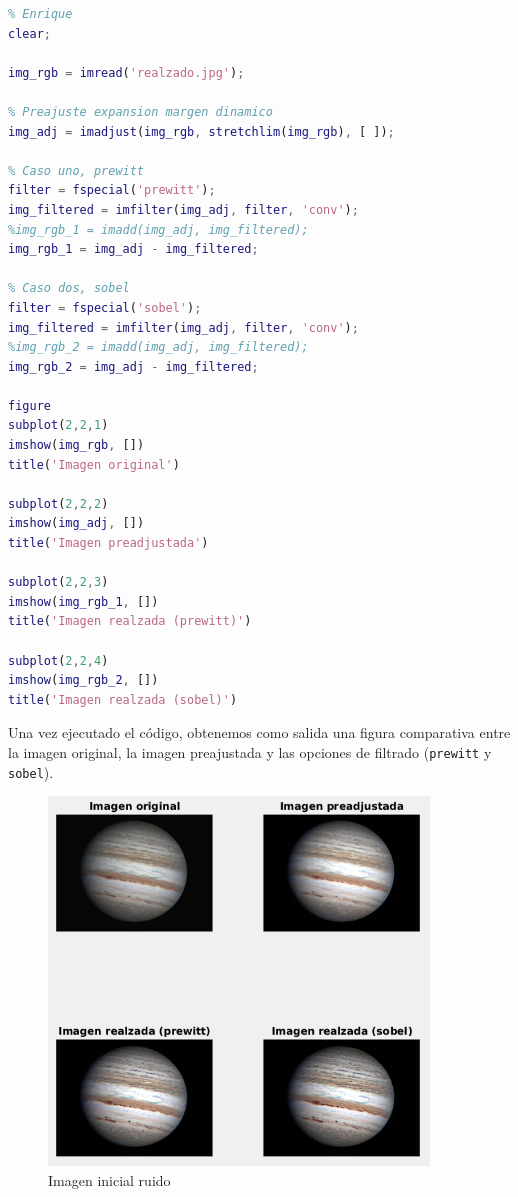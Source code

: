 \documentclass[12pt]{article}
\begin{document}
	\begin{lstlisting}[language=Matlab, caption={Implementación de filtros para el realzado en \texttt{MATLAB}}]
% 5 - Realzado
% Enrique
clear;

img_rgb = imread('realzado.jpg');

% Preajuste expansion margen dinamico
img_adj = imadjust(img_rgb, stretchlim(img_rgb), [ ]);

% Caso uno, prewitt
filter = fspecial('prewitt');
img_filtered = imfilter(img_adj, filter, 'conv');
%img_rgb_1 = imadd(img_adj, img_filtered);
img_rgb_1 = img_adj - img_filtered;

% Caso dos, sobel
filter = fspecial('sobel');
img_filtered = imfilter(img_adj, filter, 'conv');
%img_rgb_2 = imadd(img_adj, img_filtered);
img_rgb_2 = img_adj - img_filtered;

figure
subplot(2,2,1)
imshow(img_rgb, [])
title('Imagen original')

subplot(2,2,2)
imshow(img_adj, [])
title('Imagen preadjustada')

subplot(2,2,3)
imshow(img_rgb_1, [])
title('Imagen realzada (prewitt)')

subplot(2,2,4)
imshow(img_rgb_2, [])
title('Imagen realzada (sobel)')

	\end{lstlisting}

	\pagebreak
	
	\noindent Una vez ejecutado el código, obtenemos como salida una figura comparativa entre la imagen original, la imagen preajustada y las opciones de filtrado (\texttt{prewitt} y \texttt{sobel}).
	
	\begin{figure}[h]
		\begin{center}
			\includegraphics[width=0.9\textwidth]{img/realzado_output.png}
			\caption{Imagen inicial ruido}
			\label{img: realzado output}
		\end{center}
	\end{figure}
\end{document}
